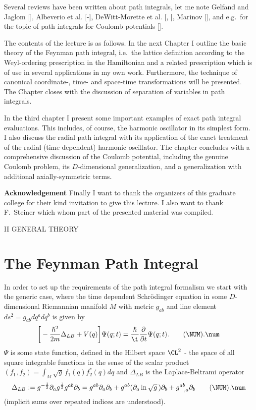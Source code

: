 Several reviews have been written about path integrals, let me note
Gelfand and Jaglom [\GY], Albeverio et al. [\ALB-\ACHRS],
DeWitt-Morette et al. [\DEWMNb, \DEWMEL], Marinov [\MARa], and e.g.\
for the topic of path integrals for Coulomb potentials [\GROm].

The contents of the lecture is as follows. In the next Chapter I
outline the basic theory of the Feynman path integral, i.e.\ the
lattice definition according to the Weyl-ordering prescription in the
Hamiltonian and a related prescription which is of use in several
applications in my own work. Furthermore, the technique of canonical
coordinate-, time- and space-time transformations will be presented.
The Chapter closes with the discussion of separation of variables
in path integrals.

In the third chapter I present some important examples of exact path
integral evaluations. This includes, of course, the harmonic oscillator
in its simplest form. I also discuss the radial path integral with its
application of the exact treatment of the radial (time-dependent)
harmonic oscillator. The chapter concludes with a comprehensive
discussion of the Coulomb potential, including the genuine Coulomb
problem, its $D$-dimensional generalization, and a generalization with
additional axially-symmetric terms.

\vfill\noindent
{\bf Acknowledgement}
\newline
Finally I want to thank the organizers of this graduate college for
their kind invitation to give this lecture. I also want to thank F.\
Steiner which whom part of the presented material was compiled.

\eject
{}               %
\def\Chapter{General Theory}
\def\Kapitel{II.\NUM}
\def\Section{The Feynman Path Integral}
\noindent
\centerline{\fourteenbf II G\large ENERAL \fourteenbf T\large HEORY}

\section{The Feynman Path Integral}
In order to set up the requirements of the path integral formalism we
start with the generic case, where the time dependent Schr\"odinger
equation in some $D$-dimensional Riemannian manifold $M$ with metric
$g_{ab}$ and line element $ds^2=g_{ab}dq^a dq^b$ is given by
\plus
$$\bigg[-{\hbar^2\over2m}\Delta_{LB}+V(q)\bigg]
       \Psi(q;t)={\hbar\over\i}{\partial\over\partial t}\Psi(q;t).
  \tag\NUM.\num$$
$\Psi$ is some state function, defined in the Hilbert space $\CL^2$ -
the space of all square integrable functions in the sense of the
scalar product $(f_1,f_2) = \int_M \sqrt{g}\, f_1(q) f_2^*(q) dq$
\newline
[$g:=\det(g_{ab}),\ f_1,f_2\in\CL^2$]
and  $\Delta_{LB}$ is the Laplace-Beltrami operator
\plus
$$\Delta_{LB}:=g^{-{1\over2}}\partial_a g^{1\over2}g^{ab}\partial_b
 =g^{ab}\partial_a\partial_b+g^{ab}(\partial_a\ln\sqrt{g}\,)
 \partial_b+g^{ab}_{\ \ ,a}\partial_b
  \tag\NUM.\num$$
(implicit sums over repeated indices are understood).

